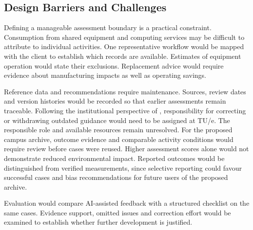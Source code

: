 \subsection{Design Barriers and Challenges}

Defining a manageable assessment boundary is a practical constraint. Consumption from shared equipment and computing services may be difficult to attribute to individual activities. One representative workflow would be mapped with the client to establish which records are available. Estimates of equipment operation would state their exclusions. Replacement advice would require evidence about manufacturing impacts as well as operating savings.

Reference data and recommendations require maintenance. Sources, review dates and version histories would be recorded so that earlier assessments remain traceable. Following the institutional perspective of \citet{hasselbalch2025sustainability}, responsibility for correcting or withdrawing outdated guidance would need to be assigned at TU/e. The responsible role and available resources remain unresolved. For the proposed campus archive, outcome evidence and comparable activity conditions would require review before cases were reused. Higher assessment scores alone would not demonstrate reduced environmental impact. Reported outcomes would be distinguished from verified measurements, since selective reporting could favour successful cases and bias recommendations for future users of the proposed archive.

Evaluation would compare AI-assisted feedback with a structured checklist on the same cases. Evidence support, omitted issues and correction effort would be examined to establish whether further development is justified.

